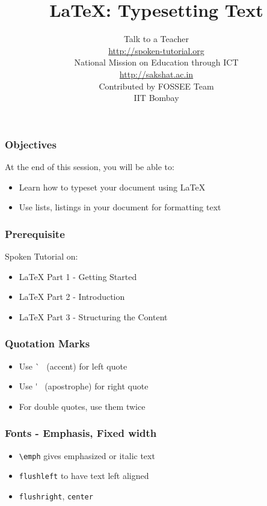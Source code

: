 \documentclass[17pt,compress]{beamer}
\author[FOSSEE]{}
\institute[IIT Bombay]{}
\date[]{}
\newcommand{\typ}[1]{\lstinline{#1}}
\begin{document}
\sffamily \bfseries
\title
[{\LaTeX}: Typesetting Text]
{{\LaTeX}: Typesetting Text}
\author
[FOSSEE]
{\small Talk to a Teacher\\{\color{blue}\url{http://spoken-tutorial.org}}\\\vspace{0.25cm}National Mission on Education
 through ICT\\{\color{blue}\url{ http://sakshat.ac.in}} \\ [1.65cm]
   Contributed by FOSSEE Team \\IIT Bombay  \\[0.3cm]
}

\begin{frame}
   \titlepage
\end{frame}

\begin{frame}
  \frametitle{Objectives}
  At the end of this session, you will be able to:
  \begin{itemize}
  \item Learn how to typeset your document using {\LaTeX}
  \item Use lists, listings in your document for formatting text
  \end{itemize}
\end{frame}

\begin{frame}
  \frametitle{Prerequisite}
  Spoken Tutorial on:
  \begin{itemize}
  \item {\LaTeX} Part 1 - Getting Started
  \item {\LaTeX} Part 2 - Introduction
  \item {\LaTeX} Part 3 - Structuring the Content
  \end{itemize}
\end{frame}

\begin{frame}[fragile]
  \frametitle{Quotation Marks}
  \begin{itemize}
  \item Use \`~ (accent) for left quote
  \item Use \'~ (apostrophe) for right quote
  \item For double quotes, use them twice
  \end{itemize}
\end{frame}

\begin{frame}[fragile]
  \frametitle{Fonts - Emphasis, Fixed width}
  \begin{itemize}
  \item \lstinline{\emph} gives emphasized or italic text
  \item \typ{flushleft} to have text left aligned
  \item \typ{flushright}, \typ{center}
  \end{itemize}
\end{frame}
\end{document}
